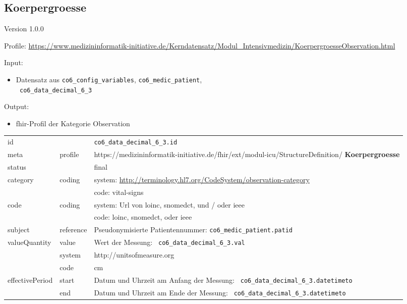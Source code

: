 \subsection{
Koerpergroesse} 
\noindent Version 1.0.0

\noindent Profile: \url{https://www.medizininformatik-initiative.de/Kerndatensatz/Modul_Intensivmedizin/KoerpergroesseObservation.html}

\noindent Input:
\begin{itemize}
	\item Datensatz aus \texttt{co6\_config\_variables}, \texttt{co6\_medic\_patient}, \\ \texttt{
co6\_data\_decimal\_6\_3}
\end{itemize}
Output:
\begin{itemize}
        \item \ac{fhir}-Profil der Kategorie \glqq Observation\grqq{}
\end{itemize}
\begin{longtable}{|l|l|p{7.5cm}|}
        \hline
        \rowcolor{lightgray} \multicolumn{3}{|l|}{Data Mapping (inhaltlich)} \\ \hline
        id &  & \texttt{co6\_data\_decimal\_6\_3.id} \\ \hline
	meta & profile & https://medizininformatik-initiative.de/fhir/ext/modul-icu/StructureDefinition/\textbf{
Koerpergroesse} \\ \hline 
	status &  & final  \\ \hline 
	category & coding & system: \url{http://terminology.hl7.org/CodeSystem/observation-category} \\
\cline{3-3}
	& & code: vital-signs \\ \hline
	code & coding & system: Url von \ac{loinc}, \ac{snomedct}, und / oder \ac{ieee} \\ 
	\cline{3-3} 
	 &  & code: \ac{loinc}, \ac{snomedct}, oder \ac{ieee} \\ \hline
	subject & reference & Pseudonymisierte Patientennummer: \texttt{co6\_medic\_patient.patid} \\ \hline
	valueQuantity & value & Wert der Messung: \texttt{
co6\_data\_decimal\_6\_3.val} \\
        \cline{2-3}
         & system & http://unitsofmeasure.org \\
         \cline{2-3}
         & code & cm \\ \hline
    effectivePeriod & start & Datum und Uhrzeit am Anfang der Messung: \texttt{
co6\_data\_decimal\_6\_3.datetimeto} \\
    \cline{2-3}
     & end & Datum und Uhrzeit am Ende der Messung: \texttt{
co6\_data\_decimal\_6\_3.datetimeto} \\ \hline
\end{longtable}



